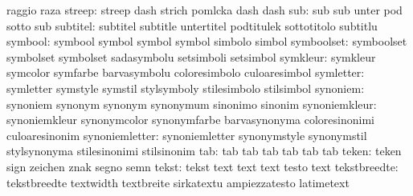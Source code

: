                            raggio                    raza
                   streep: streep                    dash
                           strich                    pomlcka
                           dash                      dash %
                      sub: sub                       sub
                           unter                     pod
                           sotto                     sub
                 subtitel: subtitel                  subtitle
                           untertitel                podtitulek
                           sottotitolo               subtitlu
                  symbool: symbool                   symbol
                           symbol                    symbol
                           simbolo                   simbol
               symboolset: symboolset                symbolset
                           symbolset                 sadasymbolu
                           setsimboli                setsimbol
                 symkleur: symkleur                  symcolor
                           symfarbe                  barvasymbolu
                           coloresimbolo             culoaresimbol
                symletter: symletter                 symstyle
                           symstil                   stylsymboly
                           stilesimbolo              stilsimbol
                 synoniem: synoniem                  synonym
                           synonym                   synonymum
                           sinonimo                  sinonim
            synoniemkleur: synoniemkleur             synonymcolor
                           synonymfarbe              barvasynonyma
                           coloresinonimi            culoaresinonim
           synoniemletter: synoniemletter            synonymstyle
                           synonymstil               stylsynonyma
                           stilesinonimi             stilsinonim
                      tab: tab                       tab
                           tab                       tab
                           tab                       tab
                    teken: teken                     sign
                           zeichen                   znak
                           segno                     semn
                    tekst: tekst                     text
                           text                      text
                           testo                     text
             tekstbreedte: tekstbreedte              textwidth
                           textbreite                sirkatextu
                           ampiezzatesto             latimetext
